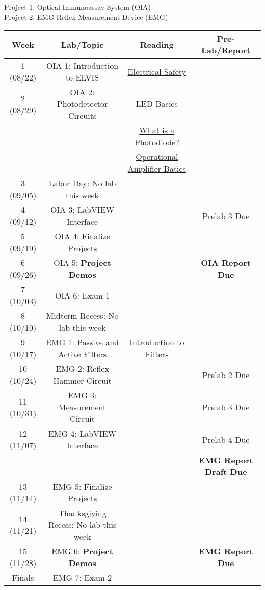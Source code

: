 \documentclass{article}
\begin{document}
{\color{red} Project 1: Optical Immunoassay System (OIA)}\\

{\color{blue} Project 2: EMG Reflex Measurement Device (EMG)}\\

\begin{table}[h!]
	\centering
\begin{tabular}[h!]{cccc}
\toprule
	Week & Lab/Topic & Reading & Pre-Lab/Report\\
	\midrule
	1 (08/22) & {\color{red} OIA 1: Introduction to ELVIS} & \href{https://www.electronicshub.org/electrical-safety/}{Electrical Safety} & \\
	2 (08/29) & {\color{red} OIA 2: Photodetector Circuits} & \href{https://www.electronicshub.org/light-emitting-diode-basics/}{LED Basics} & \\
		& & \href{https://www.electronicshub.org/photodiode-working-characteristics-applications/}{What is a Photodiode?} & \\
		& & \href{https://www.electronicshub.org/operational-amplifier-basics/}{Operational Amplifier Basics} &\\
	\midrule
	3 (09/05) & Labor Day: No lab this week & &\\
	\midrule
	4 (09/12) & {\color{red} OIA 3: LabVIEW Interface} & & {\color{red} Prelab 3 Due}\\
	5 (09/19) & {\color{red} OIA 4: Finalize Projects} & &\\
	6 (09/26) & {\color{red} OIA 5: \textbf{Project Demos}} & & {\color{red} \textbf{OIA Report Due}}\\
	7 (10/03) & {\color{red} OIA 6: Exam 1} & &\\
	\midrule
	8 (10/10) & Midterm Recess: No lab this week & &\\
	\midrule
	9 (10/17) & {\color{blue} EMG 1: Passive and Active Filters} & \href{https://www.electronicshub.org/introduction-to-filters-and-capacitive-reactance/}{Introduction to Filters} & \\
	10 (10/24) & {\color{blue} EMG 2: Reflex Hammer Circuit} & & {\color{blue} Prelab 2 Due}\\
	11 (10/31) & {\color{blue} EMG 3: Measurement Circuit} & & {\color{blue} Prelab 3 Due}\\
	12 (11/07) & {\color{blue} EMG 4: LabVIEW Interface} & & {\color{blue} Prelab 4 Due}\\
	& & & {\color{blue} \textbf{EMG Report Draft Due}}\\
	13 (11/14) & {\color{blue} EMG 5: Finalize Projects} & & \\
	\midrule
	14 (11/21) & Thanksgiving Recess: No lab this week & & \\
	\midrule
	15 (11/28) & {\color{blue} EMG 6: \textbf{Project Demos}} & & {\color{blue} \textbf{EMG Report Due}}\\
	Finals & {\color{blue} EMG 7: Exam 2} & &\\
	\bottomrule
\end{tabular}
\end{table}
\end{document}
